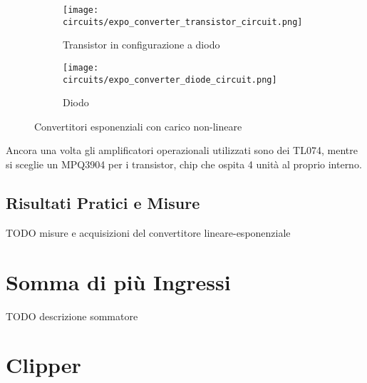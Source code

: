 \begin{figure}[H]
    \centering

    \begin{subfigure}{.5\textwidth}
        \centering
        \texttt{[image: circuits/expo\_converter\_transistor\_circuit.png]}
        \caption{Transistor in configurazione a diodo}
        \label{expo_converter_transistor_circuit}
    \end{subfigure}%
    \begin{subfigure}{.5\textwidth}
        \centering
        \texttt{[image: circuits/expo\_converter\_diode\_circuit.png]}
        \caption{Diodo}
        \label{expo_converter_diode_circuit}
    \end{subfigure}

    \caption{Convertitori esponenziali con carico non-lineare}
    \label{non_linear_load_expo}
\end{figure}

Ancora una volta gli amplificatori operazionali utilizzati sono dei TL074, mentre si sceglie
un MPQ3904 \cite{mpq3904} per i transistor, chip che ospita 4 unità al proprio interno.


\subsection*{Risultati Pratici e Misure}


TODO misure e acquisizioni del convertitore lineare-esponenziale


\section{Somma di più Ingressi}


TODO descrizione sommatore


\section{Clipper}

